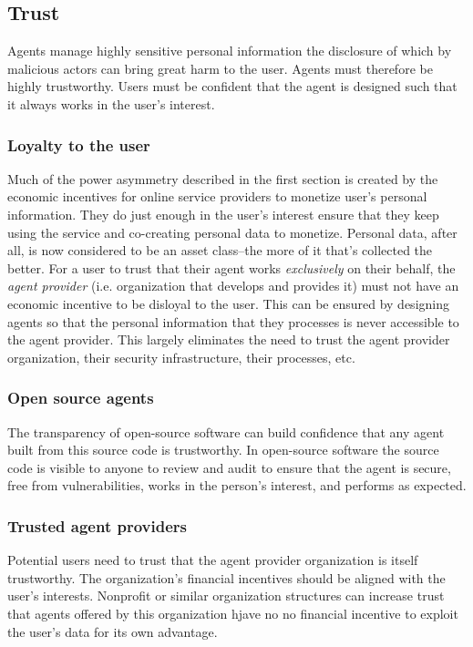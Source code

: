 \documentclass[11pt, oneside]{article}   	%
\begin{document}
\subsection{Trust}

Agents manage highly sensitive personal information the disclosure of which by malicious actors can bring great harm to the user. Agents must therefore be highly trustworthy. Users must be confident that the agent is designed such that it always works in the user's interest. 

\subsubsection{Loyalty to the user}
Much of the power asymmetry described in the first section is created by the economic incentives for online service providers to monetize user's personal information. They do just enough in the user's interest ensure that they keep using the service and co-creating personal data to monetize. Personal data, after all, is now considered to be an asset class--the more of it that's collected the better. For a user to trust that their agent works \emph{exclusively} on their behalf, the \emph{agent provider} (i.e. organization that develops and provides it) must not have an economic incentive to be disloyal to the user. This can be ensured by designing agents so that the personal information that they processes is never accessible to the agent provider. This largely eliminates the need to trust the agent provider organization, their security infrastructure, their processes, etc.

\subsubsection{Open source agents}

The transparency of open-source software can build confidence that any agent built from this source code is trustworthy. In open-source software the source code is visible to anyone to review and audit to ensure that the agent is secure, free from vulnerabilities, works in the person's interest, and performs as expected.

\subsubsection{Trusted agent providers}

Potential users need to trust that the agent provider organization is itself trustworthy. The organization's financial incentives should be aligned with the user's interests. Nonprofit or similar organization structures can increase trust that agents offered by this organization hjave no no financial incentive to exploit the user's data for its own advantage. 
\end{document}
